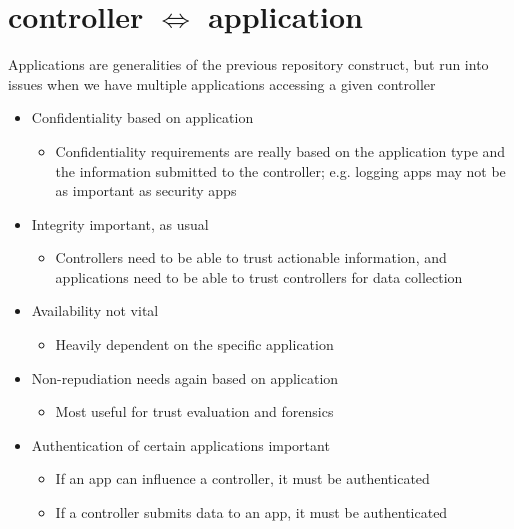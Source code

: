 \documentclass[12pt,letterpaper]{article}
\begin{document}
\newpage
\section{controller $\Longleftrightarrow$ application}
Applications are generalities of the previous repository construct, but run into issues when we have multiple applications accessing a given controller
\begin{itemize}
\item {\color{orange} Confidentiality based on application}
	\begin{itemize}
	\item Confidentiality requirements are really based on the application type and the information submitted to the controller; e.g. logging apps may not be as important as security apps
	\end{itemize}
\item {\color{red} Integrity important, as usual}
	\begin{itemize}
	\item Controllers need to be able to trust actionable information, and applications need to be able to trust controllers for data collection
	\end{itemize}
\item {\color{green} Availability not vital} 
	\begin{itemize}
	\item Heavily dependent on the specific application
	\end{itemize}
\item {\color{green} Non-repudiation needs again based on application}
	\begin{itemize}
	\item Most useful for trust evaluation and forensics
	\end{itemize}
\item {\color{red} Authentication of certain applications important}
	\begin{itemize}
	\item If an app can influence a controller, it must be authenticated
	\item If a controller submits data to an app, it must be authenticated
	\end{itemize}
\end{itemize}

\newpage
\end{document}
